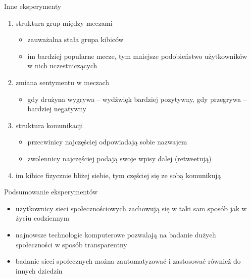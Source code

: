 \documentclass{beamer}
\begin{document}
\begin{frame}{Inne eksperymenty}
\begin{enumerate}
  \item struktura grup między meczami
  \begin{itemize}
    \item zauważalna stała grupa kibiców
    \item im bardziej popularne mecze, tym mniejsze podobieństwo użytkowników
    w nich uczestniczących 
  \end{itemize}
  \item zmiana sentymentu w meczach
  \begin{itemize}
    \item gdy drużyna wygrywa -- wydźwięk bardziej pozytywny, gdy przegrywa --
    bardziej negatywny
  \end{itemize}
  \item struktura komunikacji
  \begin{itemize}
    \item przecwinicy najczęściej odpowiadają sobie nazwajem
    \item zwolennicy najczęściej podają swoje wpisy dalej (retweetują)
  \end{itemize}
  \item im kibice fizycznie bliżej siebie, tym częściej się ze sobą komunikują
\end{enumerate}
\end{frame}
\begin{frame}{Podsumowanie eksperymentów}
\begin{itemize}
  \item użytkownicy sieci społecznościowych zachowują się w taki sam sposób
  jak w życiu codziennym
  \item najnowsze technologie komputerowe pozwalają na badanie dużych
  społeczności w sposób transparentny
  \item badanie sieci społecznych można zautomatyzować i zastosować również do
  innych dziedzin 
\end{itemize}
\end{frame}
\end{document}
